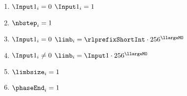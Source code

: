 \begin{center}
\end{center}

\begin{enumerate}
	\item $\Input 1_{i} = 0$ \Or $\Input 1_{i} = 1$  
	\item $\nbstep_{i}=1$
	\item \If $\Input 1 _{i}=0$ \Then $\limb_{i}=\rlprefixShortInt \cdot 256 ^{\llargeMO}$
	\item \If $\Input 1 _{i} \neq 0$ \Then $\limb_{i}=\Input 1 \cdot 256 ^{\llargeMO}$
	\item $\limbsize_{i}=1$
	\item $\phaseEnd_{i}=1$ 
\end{enumerate}
